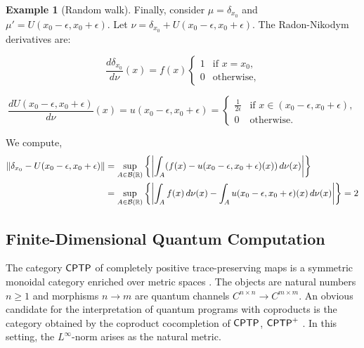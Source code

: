 \documentclass[10pt,a4paper]{amsart}
\theoremstyle{definition}
\theoremstyle{definition}
\newtheorem{example}[definition]{Example}
\theoremstyle{definition}
\theoremstyle{definition}
\theoremstyle{definition}
\theoremstyle{definition}
\begin{document}
\begin{example}[Random walk]
\begin{comment}
\end{comment}

Finally, consider $\mu = \delta_{x_0} $  and $\mu' =  U(x_0 - \epsilon, x_0 + \epsilon) $. Let \(\nu = \delta_{x_0} + U(x_0 - \epsilon, x_0 + \epsilon) \). The Radon-Nikodym derivatives are:

\[
\frac{d\delta_{x_0}}{d\nu}(x) = f (x)
\begin{cases} 
1 & \text{if } x = x_0, \\
0 & \text{otherwise},
\end{cases}
\]

\[
\frac{dU(x_0 - \epsilon, x_0 + \epsilon)}{d\nu}(x) = u(x_0 - \epsilon, x_0 + \epsilon) = 
\begin{cases} 
\frac{1}{2\epsilon} & \text{if } x \in (x_0 - \epsilon, x_0 + \epsilon), \\
0 & \text{otherwise}.
\end{cases}
\]

We compute,
\begin{align*}
  \left\lVert \delta_{x_0}-U(x_0 - \epsilon, x_0 + \epsilon) \right\rVert &= \sup_{A \in \mathcal{B}(\mathbb{R})} \left\{ \left\vert \int_A (f(x)- u(x_0 - \epsilon, x_0 + \epsilon) (x))\, d\nu(x) \right\vert \right\} \\
  &= \sup_{A \in \mathcal{B}(\mathbb{R})} \left\{ \left\vert \int_A f(x)\, d\nu(x) -  \int_A   u(x_0 - \epsilon, x_0 + \epsilon) (x) \, d\nu(x) \right\vert \right\} = 2
\end{align*}
    

\subsection{Finite-Dimensional Quantum Computation}


\vspace*{10pt}

The category $\mathsf{CPTP}$ of completely positive trace-preserving maps is a symmetric monoidal category enriched over metric spaces \cite{dahlqvist2023syntactic}. The objects are natural numbers $n \geq 1$ and morphisms $n \rightarrow m$ are quantum channels $C^{n \times n} \rightarrow C^{m\times m}$.  An obvious candidate for the interpretation of quantum programs with coproducts is the category obtained by the coproduct cocompletion of $\mathsf{CPTP}$,  $\mathsf{CPTP}^{+}$ . In this setting, the $L^{\infty}$-norm arises as the natural metric. 



\end{example}
\end{document}

